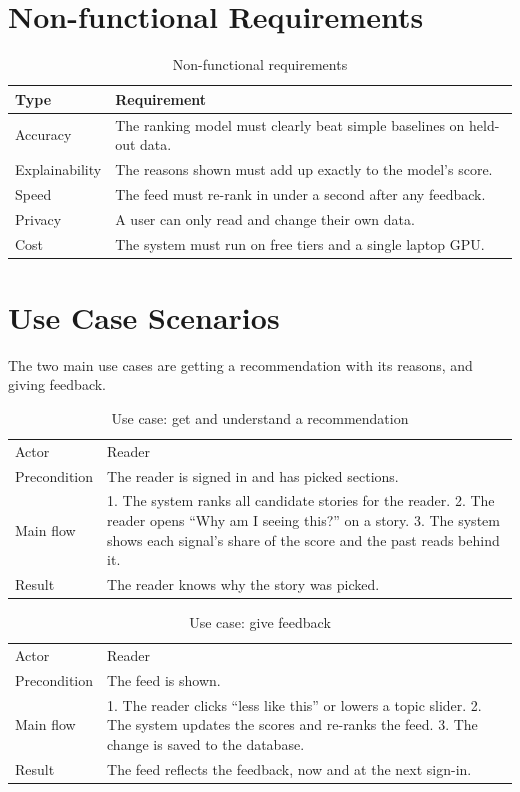 \documentclass[12pt,a4paper,oneside]{report}
\begin{document}
\section{Non-functional Requirements}
\begin{table}[H]
\centering
\caption{Non-functional requirements}
\begin{tabularx}{\textwidth}{lL}
\toprule
Type & Requirement \\
\midrule
Accuracy & The ranking model must clearly beat simple baselines on held-out data. \\
Explainability & The reasons shown must add up exactly to the model's score. \\
Speed & The feed must re-rank in under a second after any feedback. \\
Privacy & A user can only read and change their own data. \\
Cost & The system must run on free tiers and a single laptop GPU. \\
\bottomrule
\end{tabularx}
\end{table}

\section{Use Case Scenarios}
The two main use cases are getting a recommendation with its reasons, and giving feedback.
\begin{table}[H]
\centering
\caption{Use case: get and understand a recommendation}
\begin{tabularx}{\textwidth}{lL}
\toprule
Actor & Reader \\
Precondition & The reader is signed in and has picked sections. \\
Main flow & 1. The system ranks all candidate stories for the reader. 2. The reader opens ``Why am I seeing
this?'' on a story. 3. The system shows each signal's share of the score and the past reads behind it. \\
Result & The reader knows why the story was picked. \\
\bottomrule
\end{tabularx}
\end{table}

\begin{table}[H]
\centering
\caption{Use case: give feedback}
\begin{tabularx}{\textwidth}{lL}
\toprule
Actor & Reader \\
Precondition & The feed is shown. \\
Main flow & 1. The reader clicks ``less like this'' or lowers a topic slider. 2. The system updates the
scores and re-ranks the feed. 3. The change is saved to the database. \\
Result & The feed reflects the feedback, now and at the next sign-in. \\
\bottomrule
\end{tabularx}
\end{table}
\end{document}

